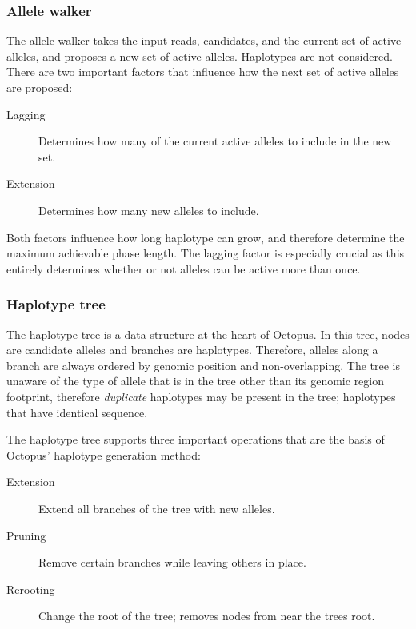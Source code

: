 \documentclass{article}
\begin{document}
\subsubsection{Allele walker}

The allele walker takes the input reads, candidates, and the current set of active alleles, and proposes a new set of active alleles. Haplotypes are not considered. There are two important factors that influence how the next set of active alleles are proposed:

\begin{description}
	\item[Lagging] Determines how many of the current active alleles to include in the new set.
	\item[Extension] Determines how many new alleles to include.
\end{description}

Both factors influence how long haplotype can grow, and therefore determine the maximum achievable phase length. The lagging factor is especially crucial as this entirely determines whether or not alleles can be active more than once.

\subsubsection{Haplotype tree}

The haplotype tree is a data structure at the heart of Octopus. In this tree, nodes are candidate alleles and branches are haplotypes. Therefore, alleles along a branch are always ordered by genomic position and non-overlapping. The tree is unaware of the type of allele that is in the tree other than its genomic region footprint, therefore \emph{duplicate} haplotypes may be present in the tree; haplotypes that have identical sequence.

The haplotype tree supports three important operations that are the basis of Octopus' haplotype generation method:

\begin{description}
	\item[Extension] Extend all branches of the tree with new alleles.
	\item[Pruning] Remove certain branches while leaving others in place.
	\item[Rerooting] Change the root of the tree; removes nodes from near the trees root.
\end{description}
\end{document}
